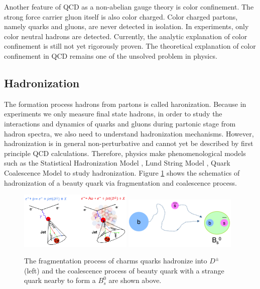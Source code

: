 Another feature of QCD as a non-abelian gauge theory is color confinement. The strong force carrier gluon itself is also color charged. Color charged partons, namely quarks and gluons, are never detected in isolation. In experiments, only color neutral hadrons are detected. Currently, the analytic explanation of color confinement is still not yet rigorously proven. The theoretical explanation of color confinement in QCD remains one of the unsolved problem in physics. 

\subsection{Hadronization}

The formation process hadrons from partons is called haronization. Because in experiments we only measure final state hadrons, in order to study the interactions and dynamics of quarks and gluons during partonic stage from hadron spectra, we also need to understand hadronization mechanisms. However, hadronization is in general non-perturbative and cannot yet be described by first principle QCD calculations. Therefore, physics make phenomenological models such as the Statistical Hadronization Model \cite{SHM}, Lund String Model \cite{LSM}, Quark Coalescence Model \cite{QCM} to study hadronization. Figure  \ref{HadMech} shows the schematics of hadronization of a beauty quark via fragmentation and coalescence process.

\begin{figure}[hbtp]
\begin{center}
\includegraphics[width=0.48\textwidth]{Figures/Chapter1/FragCartoon.png}
\includegraphics[width=0.48\textwidth]{Figures/Chapter1/CoalCartoon.png}
\caption{The fragmentation process of charms quarks hadronize into $D^\pm$ (left) and the coalescence process of beauty quark with a strange quark nearby to form a $B^0_s$ are shown above.}
\label{HadMech}
\end{center}
\end{figure} 

